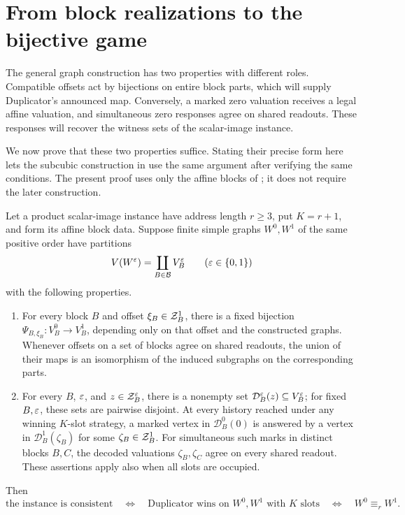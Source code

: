 \section{From block realizations to the bijective game}
\label{reduction:section}

The general graph construction has two properties with different roles.
Compatible offsets act by bijections on entire block parts, which will
supply Duplicator's announced map. Conversely, a marked zero valuation
receives a legal affine valuation, and simultaneous zero responses agree
on shared readouts. These responses will recover the witness sets of
the scalar-image instance.

We now prove that these two properties suffice. Stating their precise
form here lets the subcubic construction in  use
the same argument after verifying the same conditions. The present
proof uses only the affine blocks of ; it does
not require the later construction.

\begin{proposition}
\label{prop:game-reduction}
Let a product scalar-image instance have address length \(r\ge3\),
put \(K=r+1\), and form its affine block data. Suppose finite simple
graphs \(W^0,W^1\) of the same positive order have partitions
\[
 V(W^\varepsilon)=\coprod_{B\in\mathcal B}V_B^\varepsilon
 \qquad(\varepsilon\in\{0,1\})
\]
with the following properties.
\begin{enumerate}
\item\label{item:game-local-maps}
For every block \(B\) and offset \(\xi_B\in\mathcal Z_B^1\), there is a
fixed bijection
\(\Psi_{B,\xi_B}:V_B^0\to V_B^1\), depending only on that offset
and the constructed graphs. Whenever offsets on a set of blocks agree
on shared readouts, the union of their maps is an isomorphism of the
induced subgraphs on the corresponding parts.
\item\label{item:game-zero-decoding}
For every \(B\), \(\varepsilon\), and \(z\in\mathcal Z_B^\varepsilon\), there is a
nonempty set \(\mathcal D_B^\varepsilon(z)\subseteq V_B^\varepsilon\); for fixed
\(B,\varepsilon\), these sets are pairwise disjoint. At every history
reached under any winning \(K\)-slot strategy, a marked vertex in
\(\mathcal D_B^0(0)\) is answered by a vertex in
\(\mathcal D_B^1(\zeta_B)\) for some \(\zeta_B\in\mathcal Z_B^1\).
For simultaneous such marks in distinct blocks \(B,C\), the decoded
valuations \(\zeta_B,\zeta_C\) agree on every shared readout.
These assertions apply also when all slots are occupied.
\end{enumerate}
Then
\[
 \text{the instance is consistent}
 \quad\Longleftrightarrow\quad
 \text{Duplicator wins on \(W^0,W^1\) with \(K\) slots}
 \quad\Longleftrightarrow\quad W^0\equiv_r W^1.
\]
\end{proposition}

